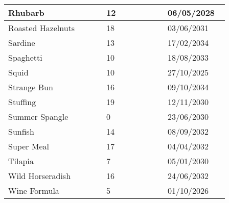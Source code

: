 \documentclass{article}
\begin{document}
\begin{longtable}{|p{0.4\linewidth}|p{0.25\linewidth}|p{0.25\linewidth}|}
\hline
Rhubarb & 12 & 06/05/2028 \\
\hline
Roasted Hazelnuts & 18 & 03/06/2031 \\
\hline
Sardine & 13 & 17/02/2034 \\
\hline
Spaghetti & 10 & 18/08/2033 \\
\hline
Squid & 10 & 27/10/2025 \\
\hline
Strange Bun & 16 & 09/10/2034 \\
\hline
Stuffing & 19 & 12/11/2030 \\
\hline
Summer Spangle & 0 & 23/06/2030 \\
\hline
Sunfish & 14 & 08/09/2032 \\
\hline
Super Meal & 17 & 04/04/2032 \\
\hline
Tilapia & 7 & 05/01/2030 \\
\hline
Wild Horseradish & 16 & 24/06/2032 \\
\hline
Wine Formula & 5 & 01/10/2026 \\
\hline
\end{longtable}
\end{document}
